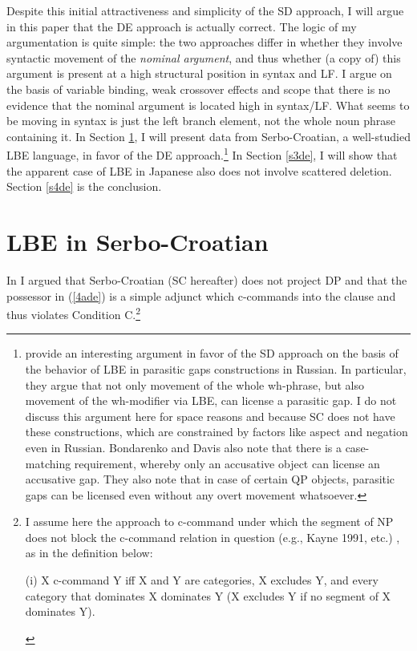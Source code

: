 \documentclass[
    output=paper,
    colorlinks,
    citecolor=brown,
]{langscibook}
\begin{document}
Despite this initial attractiveness and simplicity of the SD approach, I will argue in this paper that the DE approach is actually correct. The logic of my argumentation is quite simple: the two approaches differ in whether they involve syntactic movement of the \textit{nominal argument}, and thus whether (a copy of) this argument is present at a high structural position in syntax and LF. I argue on the basis of variable binding, weak crossover effects and scope that there is no evidence that the nominal argument is located high in syntax/LF. What seems to be moving in syntax is just the left branch element, not the whole noun phrase containing it. In Section \ref{s2de}, I will present data from Serbo-Croatian, a well-studied LBE language, in favor of the DE approach.\footnote{\citet{BondarenkoColin2018} provide an interesting argument in favor of the SD approach on the basis of the behavior of LBE in parasitic gaps constructions in Russian. In particular, they argue that not only movement of the whole wh-phrase, but also movement of the wh-modifier via LBE, can license a parasitic gap. I do not discuss this argument here for space reasons and because SC does not have these constructions, which are constrained by factors like aspect and negation even in Russian. Bondarenko and Davis also note that there is a case-matching requirement, whereby only an accusative object can license an accusative gap. They also note that in case of certain QP objects, parasitic gaps can be licensed even without any overt movement whatsoever.} In Section \ref{s3de}, I will show that the apparent case of LBE in Japanese \citep{TakahashiFunakoshi2013} also does not involve scattered deletion. Section \ref{s4de} is the conclusion. 

\section{LBE in Serbo-Croatian } \label{s2de}

In \citet{Despić2011,Despić2013} I argued that Serbo-Croatian (SC hereafter) does not project DP and that the possessor in (\ref{4ade}) is a simple adjunct which c-commands into the clause and thus violates Condition C.\footnote{I assume here the approach to c-command under which the segment of NP does not block the c-command relation in question (e.g., Kayne 1991, \citeauthor{Despić2011} \citeyear{Despić2011} etc.) , as in the definition below:
\begin{exe}
\ex (i)	X c-command Y iff X and Y are categories, X excludes Y, and every category that dominates X dominates Y (X excludes Y if no segment of X dominates Y).  
\end{exe}}
\end{document}
